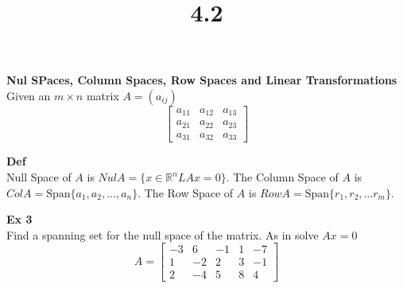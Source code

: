 \documentclass{article}
\title{4.2}
\begin{document}
    \maketitle
    \textbf{Nul SPaces, Column Spaces, Row Spaces and Linear Transformations}\\
    Given an $ m \times n $ matrix $ A = (a_{ij} ) $
    \[
       \begin{bmatrix}
         a_{11} &a_{12} &a_{13}\\
         a_{21} &a_{22} &a_{23}\\
         a_{31} &a_{32} &a_{33}   
       \end{bmatrix} 
    \]

    \textbf{Def}\\
    Null Space of $ A $ is $ NulA = \{ x \in \mathbb{R}^{n}L Ax=0  \} $. 
    The Column Space of $ A $ is $ ColA = \text{Span}\{ a_{1},a_{2},...,a_{n}\} $.
    The Row Space of $ A $ is $ RowA=\text{Span}\{ r_{1},r_{2},...r_{m} \} $.
    
    \textbf{Ex 3 }\\
    Find a spanning set for the null space of the matrix. As in solve $ Ax=0 $ 
    \[
       A = \begin{bmatrix}
            -3 &6 &-1 &1 &-7\\
            1 &-2 &2 &3 &-1\\
            2 &-4 &5 &8 &4
        \end{bmatrix}
    \]
\end{document}

